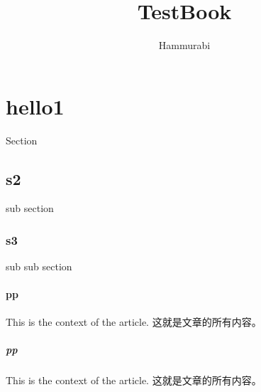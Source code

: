\documentclass[UTF8]{ctexart}
\author{Hammurabi}
\title{TestBook}
\begin{document}
    \maketitle
    \section{hello1} Section
        \subsection{s2} sub section
            \subsubsection{s3} sub sub section
                \paragraph{pp} This is the context of the article. 这就是文章的所有内容。
                \subparagraph{pp} This is the context of the article. 这就是文章的所有内容。
\end{document}
